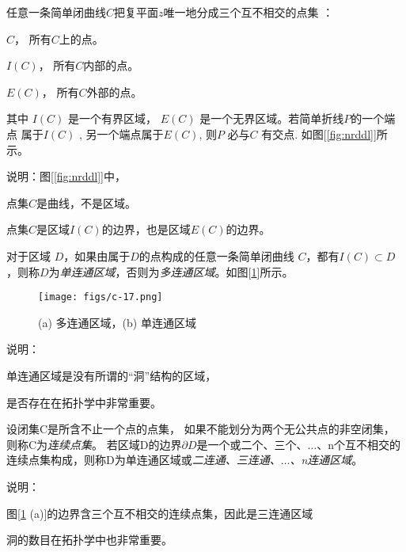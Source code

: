 \begin{theorem}[若尔当定理]\label{} \index{}
	任意一条简单闭曲线$C$把复平面$z$唯一地分成三个互不相交的点集 ：
	\begin{inparaenum}[(i)]
	  \item $C$， 所有$C$上的点。
	  \item $I(C)$， 所有$C$内部的点。
	  \item $E(C)$， 所有$C$外部的点。
	\end{inparaenum}
    其中 $I(C)$ 是一个有界区域， $E(C)$ 是一个无界区域。若简单折线$P$的一个端点
	属于$I(C)$ , 另一个端点属于$E(C)$, 则$P$ 必与$C$ 有交点. 如图[\ref{fig:nrddl}]所示。
\end{theorem}
说明：图[\ref{fig:nrddl}]中，
\begin{compactitem}
    \item 点集$C$是曲线，不是区域。
    \item 点集$C$是区域$I(C)$的边界，也是区域$E(C)$的边界。
\end{compactitem}

\begin{definition}\label{}\index{}
	对于区域 $D$，如果由属于$D$的点构成的任意一条简单闭曲线 $C$，都有$I(C)\subset D $，则称$D$为\emph{单连通区域}，否则为\emph{多连通区域}。如图[\ref{fig:ntqu}]所示。
    \begin{figure}[h]
        \centering
        \texttt{[image: figs/c-17.png]}
        \caption{(a) 多连通区域，(b) 单连通区域}
        \label{fig:ntqu}
    \end{figure}
\end{definition}
说明：\begin{compactitem}
    \item 单连通区域是没有所谓的“洞”结构的区域，
    \item 是否存在在拓扑学中非常重要。
\end{compactitem}

\begin{definition}\label{}
	设闭集C是所含不止一个点的点集， 如果不能划分为两个无公共点的非空闭集，则称C为\emph{连续点集}。 若区域D的边界$\partial D$是一个或二个、三个、$\dots$、n个互不相交的连续点集构成，则称D为单连通区域或\emph{二连通、三连通、$\dots$、n连通区域}。
\end{definition}
说明：\begin{compactitem}
    \item 图[\ref{fig:ntqu} (a)]的边界含三个互不相交的连续点集，因此是三连通区域
    \item 洞的数目在拓扑学中也非常重要。
\end{compactitem}

